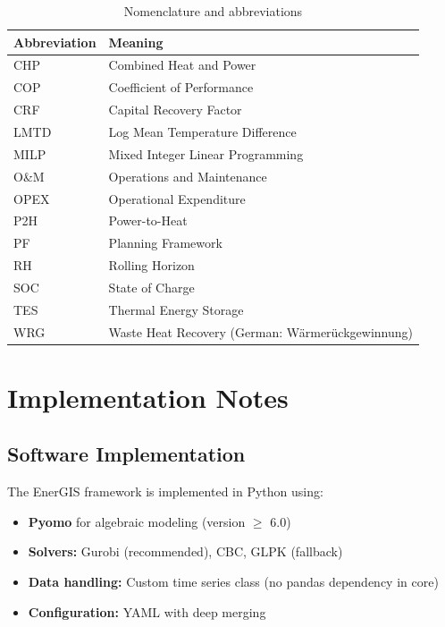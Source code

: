 \documentclass[11pt]{article}
\begin{document}
\begin{table}[h]
\centering
\small
\begin{tabular}{ll}
\toprule
\textbf{Abbreviation} & \textbf{Meaning} \\
\midrule
CHP & Combined Heat and Power \\
COP & Coefficient of Performance \\
CRF & Capital Recovery Factor \\
LMTD & Log Mean Temperature Difference \\
MILP & Mixed Integer Linear Programming \\
O\&M & Operations and Maintenance \\
OPEX & Operational Expenditure \\
P2H & Power-to-Heat \\
PF & Planning Framework \\
RH & Rolling Horizon \\
SOC & State of Charge \\
TES & Thermal Energy Storage \\
WRG & Waste Heat Recovery (German: Wärmerückgewinnung) \\
\bottomrule
\end{tabular}
\caption{Nomenclature and abbreviations}
\label{tab:nomenclature}
\end{table}

\section{Implementation Notes}

\subsection{Software Implementation}

The EnerGIS framework is implemented in Python using:
\begin{itemize}
\item \textbf{Pyomo} for algebraic modeling (version $\geq$ 6.0)
\item \textbf{Solvers:} Gurobi (recommended), CBC, GLPK (fallback)
\item \textbf{Data handling:} Custom time series class (no pandas dependency in core)
\item \textbf{Configuration:} YAML with deep merging
\end{itemize}
\end{document}
